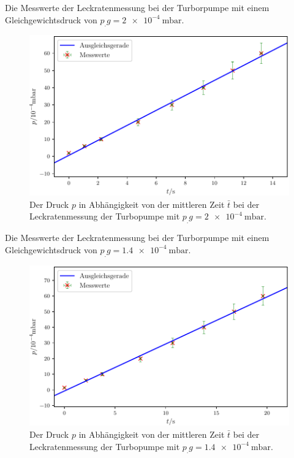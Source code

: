 \newpage
\begin{table}
\centering
\caption{Die Messwerte der Leckratenmessung bei der Turborpumpe mit einem Gleichgewichtsdruck von $p_.g = \SI{2e-4}{\milli\bar}$.}

\label{tab:TL1}
\end{table}

\begin{figure}
\centering
\includegraphics[width=\linewidth-70pt,height=\textheight-70pt,keepaspectratio]{content/images/TL1.pdf}
\caption{Der Druck $p$ in Abhängigkeit von der mittleren Zeit $\bar{t}$ bei der Leckratenmessung der Turbopumpe  mit $p_.g = \SI{2e-4}{\milli\bar}$.}
\label{fig:TL1}
\end{figure}

\newpage
\begin{table}
\centering
\caption{Die Messwerte der Leckratenmessung bei der Turborpumpe mit einem Gleichgewichtsdruck von $p_.g = \SI{1.4e-4}{\milli\bar}$.}

\label{tab:TL2}
\end{table}

\begin{figure}
\centering
\includegraphics[width=\linewidth-70pt,height=\textheight-70pt,keepaspectratio]{content/images/TL2.pdf}
\caption{Der Druck $p$ in Abhängigkeit von der mittleren Zeit $\bar{t}$ bei der Leckratenmessung der Turbopumpe  mit $p_.g = \SI{1.4e-4}{\milli\bar}$.}
\label{fig:TL2}
\end{figure}

